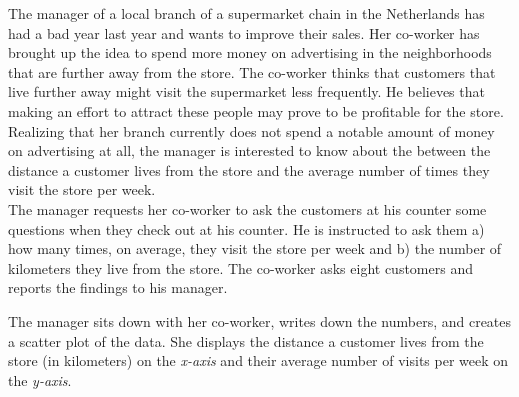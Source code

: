

The manager of a local branch of a supermarket chain in the Netherlands has had a bad year last year and wants to improve their sales. Her co-worker has brought up the idea to spend more money on advertising in the neighborhoods that are further away from the store. The co-worker thinks that customers that live further away might visit the supermarket less frequently. He believes that making an effort to attract these people may prove to be profitable for the store. Realizing that her branch currently does not spend a notable amount of money on advertising at all, the manager is interested to know about the  between the distance a customer lives from the store and the average number of times they visit the store per week. \\

The manager requests her co-worker to ask the customers at his counter some questions when they check out at his counter. He is instructed to ask them a) how many times, on average, they visit the store per week and b) the number of kilometers they live from the store. The co-worker asks eight customers and reports the findings to his manager. \\



The manager sits down with her co-worker, writes down the numbers, and creates a scatter plot of the data. She displays the distance a customer lives from the store (in kilometers) on the \textit{x-axis} and their average number of visits per week on the \textit{y-axis}. 

\clearpage %


